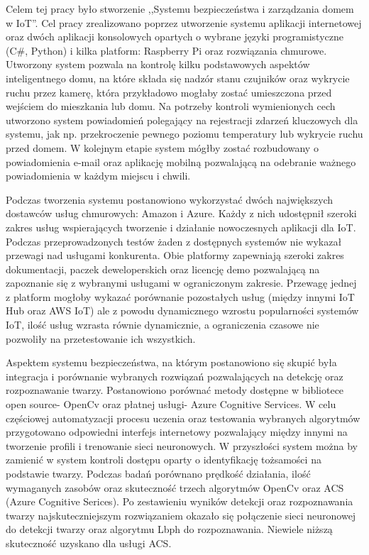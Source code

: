 Celem tej pracy było stworzenie ,,Systemu bezpieczeństwa i zarządzania domem w IoT''. Cel pracy zrealizowano poprzez utworzenie systemu aplikacji internetowej oraz dwóch aplikacji konsolowych opartych o wybrane języki programistyczne (C\#, Python) i kilka platform: Raspberry Pi oraz rozwiązania chmurowe.
Utworzony system pozwala na kontrolę kilku podstawowych aspektów inteligentnego domu, na które składa się nadzór stanu czujników oraz wykrycie ruchu przez kamerę, która przykładowo mogłaby zostać umieszczona przed wejściem do mieszkania lub domu.
Na potrzeby kontroli wymienionych cech utworzono system powiadomień polegający na rejestracji zdarzeń kluczowych dla systemu, jak np. przekroczenie pewnego poziomu temperatury lub wykrycie ruchu przed domem. W kolejnym etapie system mógłby zostać rozbudowany o powiadomienia e-mail oraz aplikację mobilną pozwalającą na odebranie ważnego powiadomienia w każdym miejscu i chwili.

Podczas tworzenia systemu postanowiono wykorzystać dwóch największych dostawców usług chmurowych: Amazon i Azure. Każdy z nich udostępnił szeroki zakres usług wspierających tworzenie i działanie nowoczesnych aplikacji dla IoT. Podczas przeprowadzonych testów żaden z dostępnych systemów nie wykazał przewagi nad usługami konkurenta. Obie platformy zapewniają szeroki zakres dokumentacji, paczek deweloperskich oraz licencję demo pozwalającą na zapoznanie się z wybranymi usługami w ograniczonym zakresie. Przewagę jednej z platform mogłoby wykazać porównanie pozostałych usług (między innymi IoT Hub oraz AWS IoT) ale z powodu dynamicznego wzrostu popularności systemów IoT, ilość usług wzrasta równie dynamicznie, a ograniczenia czasowe nie pozwoliły na przetestowanie ich wszystkich.

Aspektem systemu bezpieczeństwa, na którym postanowiono się skupić była integracja i porównanie wybranych rozwiązań pozwalających na detekcję oraz rozpoznawanie twarzy. Postanowiono porównać metody dostępne w bibliotece open source- OpenCv oraz płatnej usługi- Azure Cognitive Services. W celu częściowej automatyzacji procesu uczenia oraz testowania wybranych algorytmów przygotowano odpowiedni interfejs internetowy pozwalający między innymi na tworzenie profili i trenowanie sieci neuronowych. W przyszłości system można by zamienić w system kontroli dostępu oparty o identyfikację tożsamości na podstawie twarzy. Podczas badań porównano prędkość działania, ilość wymaganych zasobów oraz skuteczność trzech algorytmów OpenCv oraz ACS (Azure Cognitive Serices). Po zestawieniu wyników detekcji oraz rozpoznawania twarzy najskuteczniejszym rozwiązaniem okazało się połączenie sieci neuronowej do detekcji twarzy oraz algorytmu Lbph do rozpoznawania. Niewiele niższą skuteczność uzyskano dla usługi ACS. 

